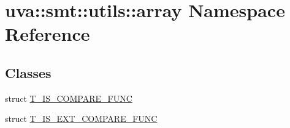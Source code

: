 \hypertarget{namespaceuva_1_1smt_1_1utils_1_1array}{}\section{uva\+:\+:smt\+:\+:utils\+:\+:array Namespace Reference}
\label{namespaceuva_1_1smt_1_1utils_1_1array}
\subsection*{Classes}
\begin{DoxyCompactItemize}
\item 
struct \hyperlink{structuva_1_1smt_1_1utils_1_1array_1_1_t___i_s___c_o_m_p_a_r_e___f_u_n_c}{T\+\_\+\+I\+S\+\_\+\+C\+O\+M\+P\+A\+R\+E\+\_\+\+F\+U\+N\+C}
\item 
struct \hyperlink{structuva_1_1smt_1_1utils_1_1array_1_1_t___i_s___e_x_t___c_o_m_p_a_r_e___f_u_n_c}{T\+\_\+\+I\+S\+\_\+\+E\+X\+T\+\_\+\+C\+O\+M\+P\+A\+R\+E\+\_\+\+F\+U\+N\+C}
\end{DoxyCompactItemize}
